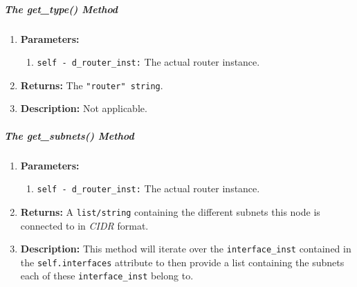         \subparagraph{The get\_type() Method}
            \begin{enumerate}
                \item \textbf{Parameters:}
                \begin{enumerate}
                    \item \texttt{self - d\_router\_inst:} The actual router instance.
                \end{enumerate}
                \item \textbf{Returns:} The \texttt{"router" string}.
                \item \textbf{Description:} Not applicable.
            \end{enumerate}

        \subparagraph{The get\_subnets() Method}
            \begin{enumerate}
                \item \textbf{Parameters:}
                \begin{enumerate}
                    \item \texttt{self - d\_router\_inst:} The actual router instance.
                \end{enumerate}
                \item \textbf{Returns:} A \texttt{list/string} containing the different subnets this node is connected to in \textit{CIDR} format.
                \item \textbf{Description:} This method will iterate over the \texttt{interface\_inst} contained in the \texttt{self.interfaces} attribute to then provide a list containing the subnets each of these \texttt{interface\_inst} belong to.
            \end{enumerate}

